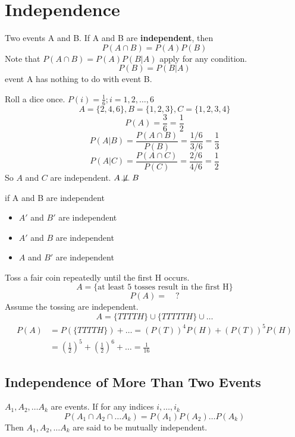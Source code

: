 \section{Independence}
\begin{defn}
  Two events A and B. If A and B are \textbf{independent}, then
  \[P(A\cap B)=P(A)P(B) \]
  Note that $P(A \cap B)=P(A)P(B|A)$ apply for any condition.
  \[  P(B)=P(B|A) \]
  event A has nothing to do with event B.
\end{defn}

\begin{exmp}
  Roll a dice once. $P(i)=\frac{1}{6}; i=1,2,\dots,6$
  \[  A=\{2,4,6\},   B=\{1,2,3\},   C=\{1,2,3,4\} \]
  \[  P(A)=\frac{3}{6}=\frac{1}{2} \]
  \[ P(A|B)=\frac{P(A\cap B)}{P(B)}=\frac{1/6}{3/6}=\frac{1}{3} \]
  \[ P(A|C)=\frac{P(A\cap C)}{P(C)}=\frac{2/6}{4/6}=\frac{1}{2} \]
So $A$ and $C$ are independent. $A \not\!\perp\!\!\!\perp B$
\end{exmp}

\begin{prop}
if A and B are independent
\begin{itemize}
  \item $A'$ and $B'$ are independent
  \item $A'$ and $B$ are independent
  \item $A$ and $B'$ are independent
\end{itemize}
\end{prop}

\begin{exmp}
  Toss a fair coin repeatedly until the first H occurs.
  \[A=\{\text{at least 5 tosses result in the first H}\}\]
  \[P(A)= \quad ?\]	 
   Assume the tossing are independent.
  \[A=\{TTTTH\}\cup	\{TTTTTH\} \cup \dots	\]
  \begin{align*}
  P(A)&=P(\{TTTTH\})+\dots =(P(T))^4 P(H)+(P(T))^5 P(H)\\
  &=\left(\frac{1}{2}\right)^5+\left(\frac{1}{2}\right)^6+\dots=\frac{1}{16}
  \end{align*}

\end{exmp}

\subsection{Independence of More Than Two Events}
\begin{defn}
$A_1,A_2,\dots A_k$ are events. If for any indices $i,\dots, i_k$
\[P(A_1 \cap A_2 \cap \dots A_k)=P(A_1)P(A_2)\dots P(A_k)\]
Then $A_1,A_2,\dots A_k$ are said to be mutually independent.
\end{defn}

